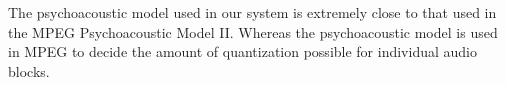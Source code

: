 The psychoacoustic model used in our system is extremely close to that used in the MPEG Psychoacoustic Model II.
Whereas the psychoacoustic model is used in MPEG to decide the amount of quantization possible for individual 
audio blocks.

\paragraph{}


%

